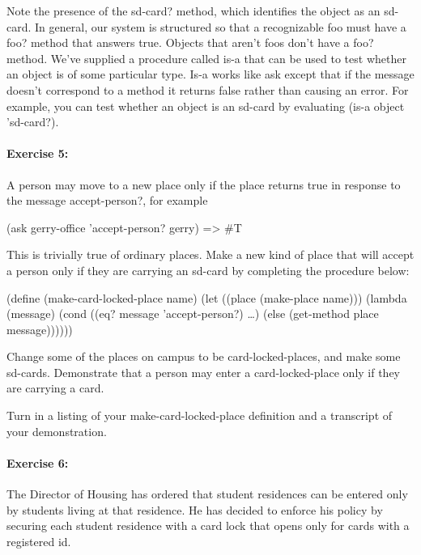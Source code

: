 Note the presence of the {\cf sd-card?} method, which identifies the
object as an sd-card.  In general, our system is structured so that a
recognizable {\cf foo} must have a {\cf foo?} method that answers {\cf
true}.  Objects that aren't {\cf foo}s don't have a {\cf foo?} method.
We've supplied a procedure called {\cf is-a} that can be used to test
whether an object is of some particular type.  {\cf Is-a} works like
{\cf ask} except that if the message doesn't correspond to a method it
returns {\cf false} rather than causing an error.  For example, you
can test whether an object is an sd-card by evaluating {\cf (is-a
object 'sd-card?)}.


\paragraph{Exercise 5:}

A person may move to a new place only if the place returns {\cf true}
in response to the message {\cf accept-person?}, for example

\beginlisp
(ask gerry-office 'accept-person? gerry)  => \#T
\null
\endlisp

This is trivially true of ordinary places.  Make a new kind of place
that will accept a person only if they are carrying an {\cf sd-card}
by completing the procedure below:

\beginlisp
(define (make-card-locked-place name)
  (let ((place (make-place name)))
    (lambda (message)
      (cond ((eq? message 'accept-person?)
             \ldots{})
            (else (get-method place message))))))
\null
\endlisp

\noindent
Change some of the places on campus to be {\cf card-locked-place}s,
and make some {\cf sd-card}s.  Demonstrate that a person may enter a
{\cf card-locked-place} only if they are carrying a card.

Turn in a listing of your {\cf make-card-locked-place}
definition and a transcript of your demonstration.


\paragraph{Exercise 6:}


The Director of Housing has ordered that student residences can be
entered only by students living at that residence.  He has decided to
enforce his policy by securing each student residence with a card lock
that opens only for cards with a registered id.

